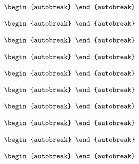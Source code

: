 \documentclass{article}
\begin{document}
\tiny

\begin{align}
  \begin{autobreak}
    
  \end{autobreak}
\end{align}

\scriptsize

\begin{align}
  \begin{autobreak}
    
  \end{autobreak}
\end{align}

\footnotesize

\begin{align}
  \begin{autobreak}
    
  \end{autobreak}
\end{align}

\small

\begin{align}
  \begin{autobreak}
    
  \end{autobreak}
\end{align}

\normalsize

\begin{align}
  \begin{autobreak}
    
  \end{autobreak}
\end{align}

\large

\begin{align}
  \begin{autobreak}
    
  \end{autobreak}
\end{align}

\Large

\begin{align}
  \begin{autobreak}
    
  \end{autobreak}
\end{align}

\LARGE

\begin{align}
  \begin{autobreak}
    
  \end{autobreak}
\end{align}

\huge

\begin{align}
  \begin{autobreak}
    
  \end{autobreak}
\end{align}

\Huge

\begin{align}
  \begin{autobreak}
    
  \end{autobreak}
\end{align}
\end{document}
